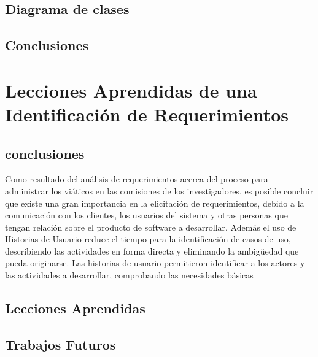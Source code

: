 \documentclass{report}
\begin{document}
    \section{Diagrama de clases}
    
    \section{Conclusiones}
       
\chapter{Lecciones Aprendidas de una Identificación de Requerimientos}
    
    \section{conclusiones}
    Como resultado del análisis de requerimientos acerca del proceso para administrar los viáticos en las comisiones de los investigadores, es posible concluir que existe una gran importancia en la elicitación de requerimientos, debido a la comunicación con los clientes, los usuarios del sistema y otras personas que tengan relación sobre el producto de software a desarrollar.
Además el uso de Historias de Usuario reduce el tiempo para la identificación de casos de uso, describiendo las actividades en forma directa y eliminando la ambigüedad que pueda originarse. Las historias de usuario permitieron identificar a los actores y las actividades a desarrollar, comprobando las necesidades básicas

    \section{Lecciones Aprendidas}
    
    \section{Trabajos Futuros}
\end{document}
